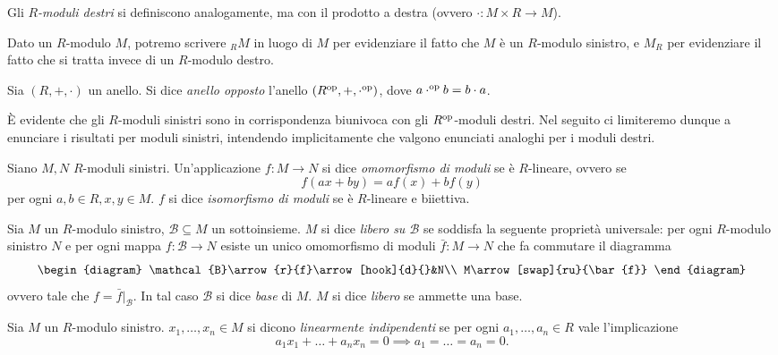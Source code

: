 Gli \emph{$R$-moduli destri} si definiscono analogamente, ma con il prodotto a destra (ovvero $\cdot:M\times R\to M$).

Dato un $R$-modulo $M$, potremo scrivere $_RM$ in luogo di $M$ per evidenziare il fatto che $M$ è un $R$-modulo sinistro, e $M_R$ per evidenziare il fatto che si tratta invece di un $R$-modulo destro.

\begin{definition}
Sia $(R,+,\cdot)$ un anello. Si dice \emph{anello opposto} l'anello $(R^{\operatorname{op}},+,\cdot^{\operatorname{op}})$, dove $a\cdot^{\operatorname{op}}b=b\cdot a$.
\end{definition}

È evidente che gli $R$-moduli sinistri sono in corrispondenza biunivoca con gli $R^{\operatorname{op}}$-moduli destri. Nel seguito ci limiteremo dunque a enunciare i risultati per moduli sinistri, intendendo implicitamente che valgono enunciati analoghi per i moduli destri.

\begin{definition}
Siano $M,N$ $R$-moduli sinistri. Un'applicazione $f:M\to N$ si dice \emph{omomorfismo di moduli} se è $R$-lineare, ovvero se
$$
f(ax+by)=af(x)+bf(y)
$$
per ogni $a,b\in R\comma x,y\in M$. $f$ si dice \emph{isomorfismo di moduli} se è $R$-lineare e biiettiva.
\end{definition}


\begin{definition}
Sia $M$ un $R$-modulo sinistro, $\mathcal{B}\subseteq M$ un sottoinsieme. $M$ si dice \emph{libero su $\mathcal{B}$} se soddisfa la seguente proprietà universale: per ogni $R$-modulo sinistro $N$ e per ogni mappa $f:\mathcal{B}\to N$ esiste un unico omomorfismo di moduli $\bar{f}:M\to N$ che fa commutare il diagramma
$$
\begin{diagram}
\mathcal{B}\arrow{r}{f}\arrow[hook]{d}{}&N\\
M\arrow[swap]{ru}{\bar{f}}
\end{diagram}
$$
ovvero tale che $f=\bar{f}|_\mathcal{B}$. In tal caso $\mathcal{B}$ si dice \emph{base} di $M$. $M$ si dice \emph{libero} se ammette una base.
\end{definition}


\begin{definition}
Sia $M$ un $R$-modulo sinistro. $x_1,\ldots,x_n\in M$ si dicono \emph{linearmente indipendenti} se per ogni $a_1,\ldots,a_n\in R$ vale l'implicazione
$$
a_1x_1+\ldots+a_nx_n=0\implies a_1=\ldots=a_n=0.
$$
\end{definition}



